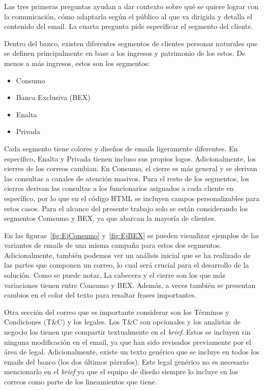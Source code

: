 Las tres primeras preguntas ayudan a dar contexto sobre qué se quiere lograr con la comunicación, cómo adaptarla según el público al que va dirigida y detalla el contenido del email. La cuarta pregunta pide especificar el segmento del cliente.

Dentro del banco, existen diferentes segmentos de clientes personas naturales que se definen principalmente en base a los ingresos y patrimonio de los estos. De menos a más ingresos, estos son los segmentos: 
\begin{itemize}
    \item Consumo
    \item Banca Exclusiva (BEX)
    \item Enalta
    \item Privada
\end{itemize}

Cada segmento tiene colores y diseños de emails ligeramente diferentes. En específico, Enalta y Privada tienen incluso sus propios logos. Adicionalmente, los cierres de los correos cambian. En Consumo, el cierre es más general y se derivan las consultas a canales de atención masivos. Para el resto de los segmentos, los cierres derivan las consultas a los funcionarios asignados a cada cliente en específico, por lo que en el código HTML se incluyen campos personalizables para estos casos. Para el alcance del presente trabajo solo se están considerando los segmentos Comsumo y BEX, ya que abarcan la mayoría de clientes. 

En las figuras~\ref{fig:EjConsumo} y~\ref{fig:EjBEX} se pueden visualizar ejemplos de las variantes de emails de una misma campaña para estos dos segmentos. Adicionalmente, también podemos ver un análisis inicial que se ha realizado de las partes que componen un correo, lo cual será crucial para el desarrollo de la solución. Como se puede notar, La cabecera y el cierre son los que más variaciones tienen entre Consumo y BEX. Además, a veces también se presentan cambios en el color del texto para resaltar frases importantes.

Otra sección del correo que es importante considerar son los Términos y Condiciones (T\&C) y los legales. Los T\&C son opcionales y los analistas de negocio los tienen que compartir textualmente en el \textit{brief}. Estos se incluyen sin ninguna modificación en el email, ya que han sido revisados previamente por el área de legal. Adicionalmente, existe un texto genérico que se incluye en todos los emails del banco (los dos últimos párrafos). Este legal genérico no es necesario mencionarlo en el \textit{brief} ya que el equipo de diseño siempre lo incluye en los correos como parte de los lineamientos que tiene. 

